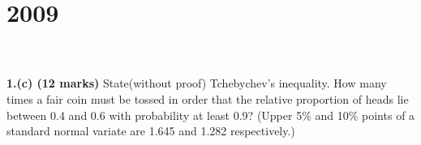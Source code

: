 \section*{2009}
\vspace{-.5cm}
\hrulefill \\\\
\textbf{1.(c) (12 marks)} State(without proof) Tchebychev's inequality. How many times a fair coin must be tossed in order that the relative proportion of heads lie between 0.4 and 0.6 with probability at least 0.9? (Upper 5\% and 10\% points of a standard normal variate are 1.645 and 1.282 respectively.)


